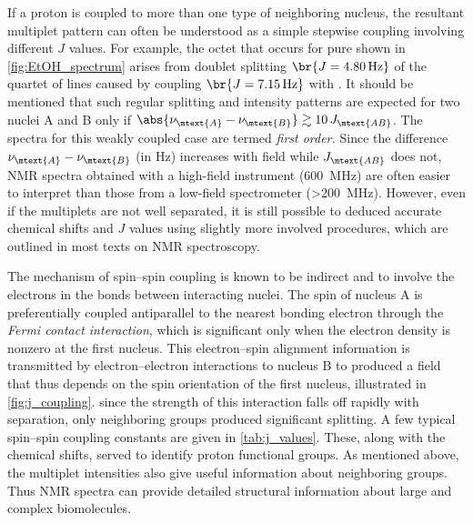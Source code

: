 If a proton is coupled to more than one type of neighboring nucleus, the resultant multiplet pattern can often be understood as a simple stepwise coupling involving different \( J \) values.
For example, the  octet that occurs for pure  shown in \cref{fig:EtOH_spectrum} arises from  doublet splitting \( \br{J = \SI{4.80}{\Hz}} \) of the quartet of lines caused by coupling \( \br{J = \SI{7.15}{\Hz}} \) with . 
It should be mentioned that such regular splitting and intensity patterns are expected for two nuclei A and B only if \( \abs{\nu_\mtext{A} - \nu_\mtext{B}} \gtrsim 10\,J_\mtext{AB} \). 
The spectra for this weakly coupled case are termed \emph{first order.}
Since the difference \( \nu_\mtext{A} - \nu_\mtext{B} \) (in \si{\Hz}) increases with field while \( J_\mtext{AB} \) does not, NMR spectra obtained with a high-field instrument (\SI{600}{\MHz}) are often easier to interpret than those from a low-field spectrometer (\SI{>200}{\MHz}). 
However, even if the multiplets are not well separated, it is still possible to deduced accurate chemical shifts and \( J \) values using slightly more involved procedures, which are outlined in most texts on NMR spectroscopy.\autocite{davis1965advanced,pople1959nmr,silverstein2005spec,burdett1964a,rogers1956a}

The mechanism of spin--spin coupling is known to be indirect and to involve the electrons in the bonds between interacting nuclei. 
The spin of nucleus A is preferentially coupled antiparallel to the nearest bonding electron through the \emph{Fermi contact interaction}, which is significant only when the electron density is nonzero at the first nucleus.
This electron--spin alignment information is transmitted by electron--electron interactions to nucleus B to produced a field that thus depends on the spin orientation of the first nucleus, illustrated in \cref{fig:j_coupling}. 
since the strength of this interaction falls off rapidly with separation, only neighboring groups produced significant splitting. 
A few typical spin--spin coupling constants are given in \cref{tab:j_values}. 
These, along with the chemical shifts, served to identify proton functional groups. 
As mentioned above, the multiplet intensities also give useful information about neighboring groups. 
Thus NMR spectra can provide detailed structural information about large and complex biomolecules. 

